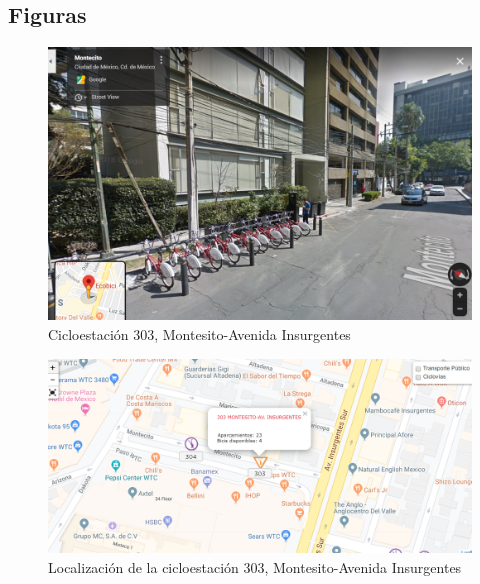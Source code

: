 \documentclass[9pt,twocolumn,twoside]{ilcss}
\begin{document}
\begin{appendices}


	\section{Figuras}


\begin{figure}[tbhp]
	\centering
	\includegraphics[width=0.9\linewidth]{Paper/images/estacion303.png}
	\caption{Cicloestación 303, Montesito-Avenida Insurgentes}
	\label{fig:pen_habs_penbc303}
\end{figure}
\begin{figure}[tbhp]
	\centering
	\includegraphics[width=0.9\linewidth]{Paper/images/estacion303_mapa.png}
	\caption{ Localización de la cicloestación 303, Montesito-Avenida Insurgentes}
	\label{fig:pen_habs_penbc303loc}
\end{figure}



\end{appendices}
\end{document}
